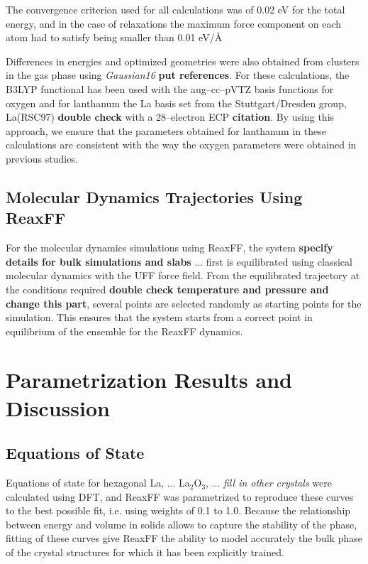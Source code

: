 \documentclass[journal=jpcafh,manuscript=article]{achemso}
\begin{document}
The convergence criterion used for all calculations was of 0.02 eV for the total energy, and in the case of relaxations the maximum force component on each atom had to satisfy being smaller than 0.01 eV/\AA 

Differences in energies and optimized geometries were also obtained from clusters in the gas phase using \emph{Gaussian16} \textbf{put references}.
For these calculations, the B3LYP functional has been used with the aug--cc--pVTZ basis functions for oxygen and for lanthanum the La basis set from the Stuttgart/Dresden group, La(RSC97) \textbf{double check} with a 28--electron ECP \textbf{citation}.
By using this approach, we ensure that the parameters obtained for lanthanum in these calculations are consistent with the way the oxygen parameters were obtained in previous studies.

\subsection{Molecular Dynamics Trajectories Using ReaxFF}
\label{sec:md-details}

For the molecular dynamics simulations using ReaxFF, the system \textbf{specify details for bulk simulations and slabs} ... first is equilibrated using classical molecular dynamics with the UFF force field.
From the equilibrated trajectory at the conditions required \textbf{double check temperature and pressure and change this part}, several points are selected randomly as starting points for the simulation.
This ensures that the system starts from a correct point in equilibrium of the ensemble for the ReaxFF dynamics.

\section{Parametrization Results and Discussion}
\label{sec:results-and-discussion}

\subsection{Equations of State}

Equations of state for hexagonal La, ... La$_2$O$_3$, ... \emph{fill in other crystals} were calculated using DFT, and ReaxFF was parametrized to reproduce these curves to the best possible fit, i.e. using weights of 0.1 to 1.0.
Because the relationship between energy and volume in solids allows to capture the stability of the phase, fitting of these curves give ReaxFF the ability to model accurately the bulk phase of the crystal structures for which it has been explicitly trained.
\end{document}
